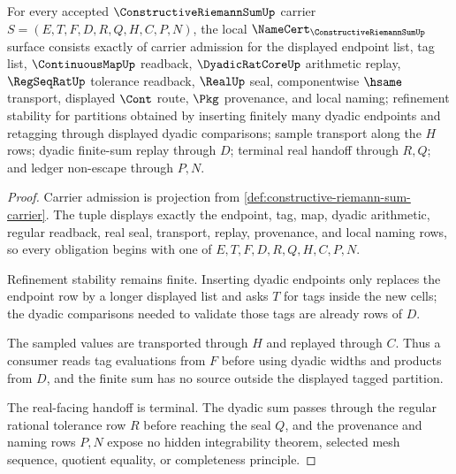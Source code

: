 \begin{theorem}
\label{thm:constructive-riemann-sum-namecert-obligations}
For every accepted $\ConstructiveRiemannSumUp$ carrier $S=(E,T,F,D,R,Q,H,C,P,N)$, the local $\NameCert_{\ConstructiveRiemannSumUp}$ surface consists exactly of carrier admission for the displayed endpoint list, tag list, $\ContinuousMapUp$ readback, $\DyadicRatCoreUp$ arithmetic replay, $\RegSeqRatUp$ tolerance readback, $\RealUp$ seal, componentwise $\hsame$ transport, displayed $\Cont$ route, $\Pkg$ provenance, and local naming; refinement stability for partitions obtained by inserting finitely many dyadic endpoints and retagging through displayed dyadic comparisons; sample transport along the $H$ rows; dyadic finite-sum replay through $D$; terminal real handoff through $R,Q$; and ledger non-escape through $P,N$.
\end{theorem}
\begin{proof}
Carrier admission is projection from \autoref{def:constructive-riemann-sum-carrier}. The tuple displays exactly the endpoint, tag, map, dyadic arithmetic, regular readback, real seal, transport, replay, provenance, and local naming rows, so every obligation begins with one of $E,T,F,D,R,Q,H,C,P,N$.

Refinement stability remains finite. Inserting dyadic endpoints only replaces the endpoint row by a longer displayed list and asks $T$ for tags inside the new cells; the dyadic comparisons needed to validate those tags are already rows of $D$.

The sampled values are transported through $H$ and replayed through $C$. Thus a consumer reads tag evaluations from $F$ before using dyadic widths and products from $D$, and the finite sum has no source outside the displayed tagged partition.

The real-facing handoff is terminal. The dyadic sum passes through the regular rational tolerance row $R$ before reaching the seal $Q$, and the provenance and naming rows $P,N$ expose no hidden integrability theorem, selected mesh sequence, quotient equality, or completeness principle.
\end{proof}


